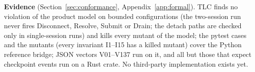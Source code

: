 \smallskip\noindent\textbf{Evidence} (Section~\ref{sec:conformance},
Appendix~\ref{app:formal}). TLC finds no violation of the product model on
bounded configurations (the two-session run never fires Disconnect,
Resolve, Submit or Drain; the detach paths are checked only in
single-session runs) and kills every mutant of the model; the pytest
cases and the mutants (every invariant I1--I15 has a killed mutant) cover
the Python reference bridge; JSON vectors V01--V137 run on it, and all but those that expect checkpoint events run on a Rust crate. No third-party implementation exists yet.

\tableofcontents
\newpage

